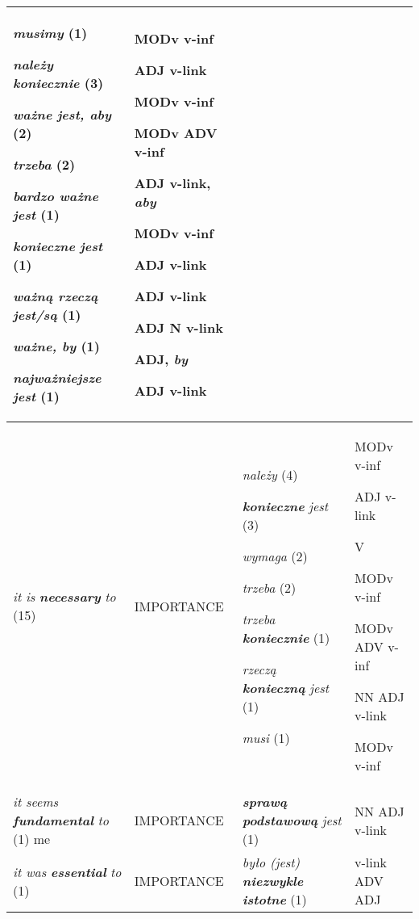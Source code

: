 \documentclass[12pt]{article}
\begin{document}
\begin{flushleft}
\begin{supertabular}{|m{0.98095983in}|m{0.90525985in}|m{1.7920599in}|m{0.9045598in}|}
\textit{musimy} (1)

\textit{należy }\textbf{\textit{koniecznie}} (3)

\textbf{\textit{ważne}}\textit{ jest, aby} (2)

\textit{trzeba} (2)

\textbf{\textit{bardzo ważne}}\textit{ jest} (1)

\textbf{\textit{konieczne}}\textit{ jest} (1)

\textbf{\textit{ważną rzeczą}}\textit{ jest/są} (1)

\textbf{\textit{ważne}}\textit{, by} (1)

\textbf{\textit{najważniejsze}}\textit{ jest} (1) &
MODv v-inf

ADJ v-link 

MODv v-inf

MODv ADV v-inf

ADJ v-link, \textit{aby}

MODv v-inf

ADJ v-link

ADJ v-link

ADJ N v-link

ADJ, \textit{by}

ADJ v-link\\\hline
\textit{it is }\textbf{\textit{necessary}}\textit{ to} (15) &
IMPORTANCE &
\textit{należy} (4)

\textbf{\textit{konieczne}}\textit{ jest} (3)

\textit{wymaga}\footnotemark{} (2)

\textit{trzeba} (2)

\textit{trzeba }\textbf{\textit{koniecznie}} (1)

\textit{rzeczą }\textbf{\textit{konieczną }}\textit{jest} (1)

\textit{musi} (1) &
MODv v-inf

ADJ v-link

V

MODv v-inf

MODv ADV v-inf

NN ADJ v-link

MODv v-inf\\\hline
\textit{it seems }\textbf{\textit{fundamental}}\textit{ to} (1) me &
IMPORTANCE &
\textbf{\textit{sprawą podstawową}}\textit{ jest} (1) &
NN ADJ v-link\\\hline
\textit{it was }\textbf{\textit{essential}}\textit{ to} (1) &
IMPORTANCE &
\textit{było (jest) }\textbf{\textit{niezwykle istotne}} (1) &
v-link ADV ADJ \\\hline
\end{supertabular}
\end{flushleft}
\end{document}
